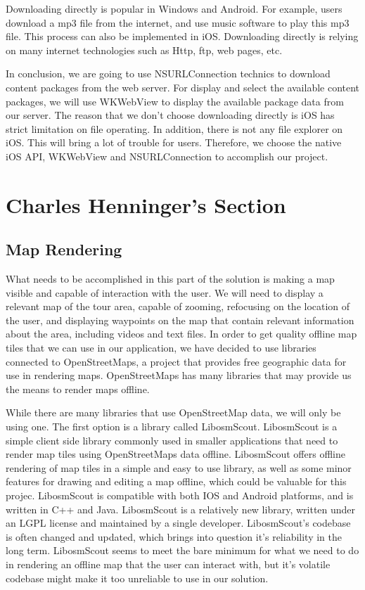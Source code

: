 \documentclass[letterpaper, 10pt,titlepage]{article}
\begin{document}
Downloading directly is popular in Windows and Android. For example, users download a mp3 file from the internet, and use music software to play this mp3 file. This process can also be implemented in iOS. Downloading directly is relying on many internet technologies such as Http, ftp, web pages, etc. 


In conclusion, we are going to use NSURLConnection technics to download content packages from the web server. For display and select the available content packages, we will use WKWebView to display the available package data from our server. The reason that we don’t choose downloading directly is iOS has strict limitation on file operating. In addition, there is not any file explorer on iOS. This will bring a lot of trouble for users. Therefore, we choose the native iOS API, WKWebView and NSURLConnection to accomplish our project.

\vspace{0.5cm}


\section{Charles Henninger's Section}
\subsection{Map Rendering}
What needs to be accomplished in this part of the solution is making a map visible and capable of interaction with the user. We will need to display a relevant map of the tour area, capable of zooming, refocusing on the location of the user, and displaying waypoints on the map that contain relevant information about the area, including videos and text files. In order to get quality offline map tiles that we can use in our application, we have decided to use libraries connected to OpenStreetMaps, a project that provides free geographic data for use in rendering maps. OpenStreetMaps has many libraries that may provide us the means to render maps offline.


While there are many libraries that use OpenStreetMap data, we will only be using one. The first option is a library called LibosmScout. LibosmScout is a simple client side library commonly used in smaller applications that need to render map tiles using OpenStreetMaps data offline. LibosmScout offers offline rendering of map tiles in a simple and easy to use library, as well as some minor features for drawing and editing a map offline, which could be valuable for this projec. LibosmScout is compatible with both IOS and Android platforms, and is written in C++ and Java. LibosmScout is a relatively new library, written under an LGPL license and maintained by a single developer. LibosmScout’s codebase is often changed and updated, which brings into question it’s reliability in the long term. LibosmScout seems to meet the bare minimum for what we need to do in rendering an offline map that the user can interact with, but it’s volatile codebase might make it too unreliable to use in our solution. 
\end{document}
